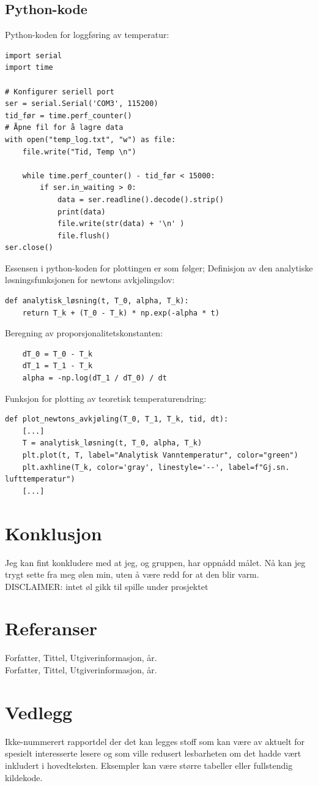 \documentclass{article}
\begin{document}
\subsection{Python-kode}
Python-koden for loggføring av temperatur:
\begin{verbatim}
import serial
import time

# Konfigurer seriell port
ser = serial.Serial('COM3', 115200)
tid_før = time.perf_counter()
# Åpne fil for å lagre data
with open("temp_log.txt", "w") as file:
    file.write("Tid, Temp \n")

    while time.perf_counter() - tid_før < 15000:
        if ser.in_waiting > 0:
            data = ser.readline().decode().strip()
            print(data)
            file.write(str(data) + '\n' )
            file.flush()
ser.close()
\end{verbatim}
Essensen i python-koden for plottingen er som følger;
Definisjon av den analytiske løsningsfunksjonen for newtons avkjølingslov:
\begin{verbatim}
def analytisk_løsning(t, T_0, alpha, T_k):
    return T_k + (T_0 - T_k) * np.exp(-alpha * t)
\end{verbatim}
Beregning av proporsjonalitetskonstanten:
\begin{verbatim}
    dT_0 = T_0 - T_k
    dT_1 = T_1 - T_k
    alpha = -np.log(dT_1 / dT_0) / dt
\end{verbatim}
Funksjon for plotting av teoretisk temperaturendring:
\begin{verbatim}
def plot_newtons_avkjøling(T_0, T_1, T_k, tid, dt): 
    [...]
    T = analytisk_løsning(t, T_0, alpha, T_k)
    plt.plot(t, T, label="Analytisk Vanntemperatur", color="green")
    plt.axhline(T_k, color='gray', linestyle='--', label=f"Gj.sn. lufttemperatur")
    [...]
\end{verbatim}

\section{Konklusjon}
Jeg kan fint konkludere med at jeg, og gruppen, har oppnådd målet. Nå kan jeg trygt sette fra meg ølen min, uten å være redd for at den blir varm. 
DISCLAIMER: intet øl gikk til spille under prosjektet

\section*{Referanser}
Forfatter, Tittel, Utgiverinformasjon, år. \\
Forfatter, Tittel, Utgiverinformasjon, år.

\section*{Vedlegg}
Ikke-nummerert rapportdel der det kan legges stoff som kan være av aktuelt for spesielt interesserte lesere og som ville redusert lesbarheten om det hadde vært inkludert i hovedteksten. Eksempler kan være større tabeller eller fullstendig kildekode.
\end{document}
